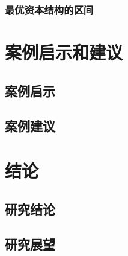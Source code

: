 \subsection{最优资本结构的区间}


\chapter{案例启示和建议}
\section{案例启示}
\section{案例建议}

\chapter{结论}
\section{研究结论}
\section{研究展望}